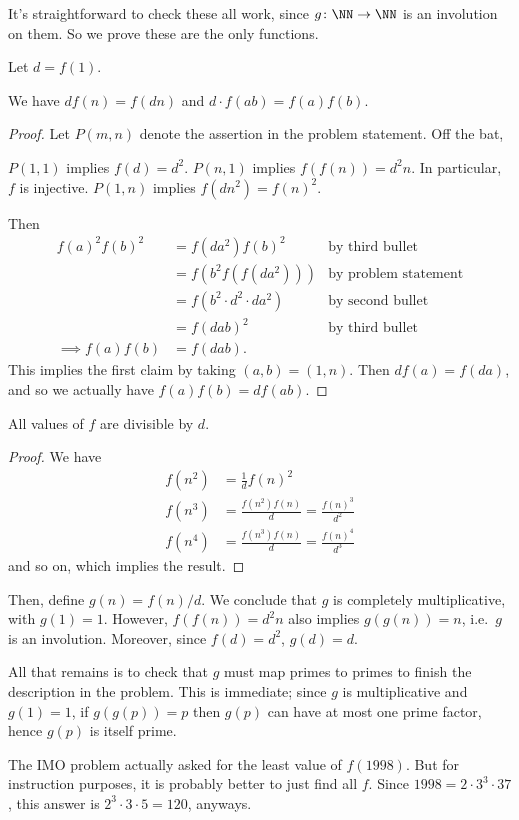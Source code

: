 \documentclass[11pt]{scrartcl}
\begin{document}
It's straightforward to check these all work,
since $g \colon \NN \to \NN$ is an involution on them.
So we prove these are the only functions.

Let $d = f(1)$.
\begin{claim*}
  We have $df(n) = f(dn)$ and $d \cdot f(ab) = f(a) f(b)$.
\end{claim*}
\begin{proof}
  Let $P(m,n)$ denote the assertion in the problem statement.
  Off the bat,
  \begin{itemize}
    \ii $P(1,1)$ implies $f(d) = d^2$.
    \ii $P(n,1)$ implies $f(f(n)) = d^2n$.
    In particular, $f$ is injective.
    \ii $P(1,n)$ implies $f(dn^2) = f(n)^2$.
  \end{itemize}
  Then
  \begin{align*}
    f(a)^2 f(b)^2 &= f(da^2) f(b)^2 & \text{by third bullet}\\
    &= f(b^2 f(f(da^2))) & \text{by problem statement} \\
    &= f(b^2 \cdot d^2 \cdot da^2) & \text{by second bullet} \\
    &= f(dab)^2 & \text{by third bullet} \\
    \implies f(a) f(b) &= f(dab).
  \end{align*}
  This implies the first claim by taking $(a,b) = (1,n)$.
  Then $df(a) = f(da)$, and so we actually have
  $f(a) f(b) = d f(ab)$.
\end{proof}
\begin{claim*}
  All values of $f$ are divisible by $d$.
\end{claim*}
\begin{proof}
  We have
  \begin{align*}
    f(n^2) &= \frac 1d f(n)^2 \\
    f(n^3) &= \frac{f(n^2) f(n)}{d} = \frac{f(n)^3}{d^2} \\
    f(n^4) &= \frac{f(n^3) f(n)}{d} = \frac{f(n)^4}{d^3}
  \end{align*}
  and so on,
  which implies the result.
\end{proof}
Then, define $g(n) = f(n) / d$.
We conclude that $g$ is completely multiplicative, with $g(1) = 1$.
However, $f(f(n)) = d^2n$ also implies $g(g(n)) = n$,
i.e.\ $g$ is an involution.
Moreover, since $f(d) = d^2$, $g(d) = d$.

All that remains is to check that $g$ must map primes to primes
to finish the description in the problem.
This is immediate; since $g$ is multiplicative and $g(1) = 1$,
if $g(g(p)) = p$ then $g(p)$ can have at most one prime factor,
hence $g(p)$ is itself prime.

\begin{remark*}
  The IMO problem actually asked for the least value of $f(1998)$.
  But for instruction purposes,
  it is probably better to just find all $f$.
  Since $1998 = 2 \cdot 3^3 \cdot 37$,
  this answer is $2^3 \cdot 3 \cdot 5 = 120$, anyways.
\end{remark*}
\pagebreak
\end{document}

